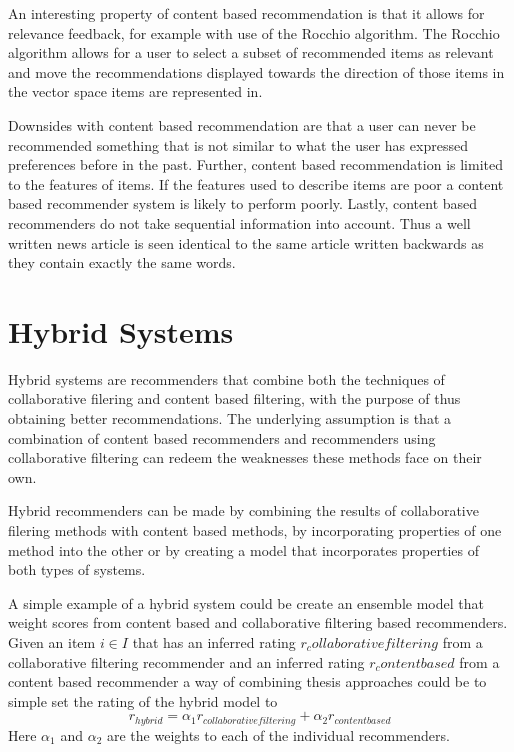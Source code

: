 \documentclass[a4paper,11pt]{kth-mag}
\begin{document}
An interesting property of content based recommendation is that it allows for relevance feedback, for example with use of the Rocchio algorithm. The Rocchio algorithm allows for a user to select a subset of recommended items as relevant and move the recommendations displayed towards the direction of those items in the vector space items are represented in\cite{pazzani2007content}.

Downsides with content based recommendation are that a user can never be recommended something that is not similar to what the user has expressed preferences before in the past. Further, content based recommendation is limited to the features of items. If the features used to describe items are poor a content based recommender system is likely to perform poorly. Lastly, content based recommenders do not take sequential information into account. Thus a well written news article is seen identical to the same article written backwards as they contain exactly the same words\cite{adomavicius2005toward}.

\section{Hybrid Systems}
Hybrid systems are recommenders that combine both the techniques of collaborative filering and content based filtering, with the purpose of thus obtaining better recommendations. The underlying assumption is that a combination of content based recommenders and recommenders using collaborative filtering can redeem the weaknesses these methods face on their own\cite{gunawardana2009unified}. 

Hybrid recommenders can be made by combining the results of collaborative filering methods with content based methods, by incorporating properties of one method into the other or by creating a model that incorporates properties of both types of systems\cite{adomavicius2005toward}. 

A simple example of a hybrid system could be create an ensemble model that weight scores from content based and collaborative filtering based recommenders. Given an item $i \in I$ that has an inferred rating $r_collaborative filtering$ from a collaborative filtering recommender and an inferred rating $r_content based$ from a content based recommender a way of combining thesis approaches could be to simple set the rating of the hybrid model to \[ r_{hybrid} = \alpha_1 r_{collaborative filtering} + \alpha_2 r_{content based}\] Here $\alpha_1$ and $\alpha_2$ are the weights to each of the individual recommenders.
\end{document}
